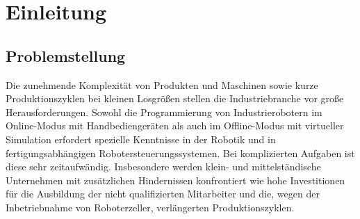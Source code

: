 \documentclass[14pt,a4paper,titlepage]{article}
\begin{document}
	\begin{abstract}
		
		Ich möchte mich bei Prof. Stefan Bischoff bedanken, dass er mein Betreuer an der Hochschule ist, und mich bei dem Praktikum unterstützt. 
		\bigbreak
		Ich möchte auch Dr. Dai Fan, meinem Betreuer im ABB Forschungszentrum danken. In meinem Praktikum hat er mir bezüglich theoretischer Fachkenntnisse und auch im praktischen Anwendungsbereich viel Unterstützung gegeben. Er hat mir alles eindeutig erklärt mit viel Geduld und Verständnis. 
	\end{abstract}
	\renewcommand{\abstractname}{Selbständigkeitserklärung}
	\begin{abstract}
		
		Ich versichere hiermit, dass ich meine Praxisarbeit mit dem Thema „Untersuchung und Implementierung von Methoden der CAD-gestützten Roboterprogrammierung“ selbstständig verfasst und keine anderen als die angegebenen Quellen und Hilfsmittel benutzt habe. Ich versichere zudem, dass die eingereichte elektronische Fassung mit der gedruckten Fassung übereinstimmt.
		\bigbreak
		Die Arbeit wurde bisher keiner anderen Prüfungsbehörde vorgelegt und auch noch nicht veröffentlicht.
		\vfill
		\begin{minipage}{2.0in}
			{\large \underline{Mannheim, \today}
			\\ Ort, Datum}
		\end{minipage}
		\hfill
		\begin{minipage}{2.0in}
			{\large \underline{\hspace{3cm}Dongliang Cao}
				\\ Unterschrift}
		\end{minipage}
	\end{abstract}
	\tableofcontents
	\pagebreak
	\section{Einleitung}
	\subsection{Problemstellung}
		Die zunehmende Komplexität von Produkten und Maschinen sowie kurze Produktionszyklen bei kleinen Losgrößen stellen die Industriebranche vor große Herausforderungen. Sowohl die Programmierung von Industrierobotern im Online-Modus mit Handbediengeräten als auch im Offline-Modus mit virtueller Simulation erfordert spezielle Kenntnisse in der Robotik und in fertigungsabhängigen Robotersteuerungssystemen. Bei komplizierten Aufgaben ist diese sehr zeitaufwändig. Insbesondere werden klein- und mittelständische Unternehmen mit zusätzlichen Hindernissen konfrontiert wie hohe Investitionen für die Ausbildung der nicht qualifizierten Mitarbeiter und die, wegen der Inbetriebnahme von Roboterzeller, verlängerten Produktionszyklen.   
\end{document}
